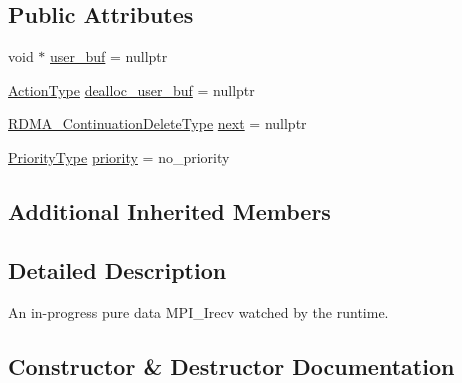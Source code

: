 \subsection*{Public Attributes}
\begin{DoxyCompactItemize}
\item 
void $\ast$ \hyperlink{structvt_1_1messaging_1_1_in_progress_data_i_recv_abe6d7de2eeb0aaa8bd453a7cb24969a8}{user\+\_\+buf} = nullptr
\item 
\hyperlink{namespacevt_ae0a5a7b18cc99d7b732cb4d44f46b0f3}{Action\+Type} \hyperlink{structvt_1_1messaging_1_1_in_progress_data_i_recv_ad1cd80fe79577e1a22177ad1f49f8c0d}{dealloc\+\_\+user\+\_\+buf} = nullptr
\item 
\hyperlink{namespacevt_a4dfad0b5809d9812d60a0311a45ae0c2}{R\+D\+M\+A\+\_\+\+Continuation\+Delete\+Type} \hyperlink{structvt_1_1messaging_1_1_in_progress_data_i_recv_a5ad86cdc45485f33d787fdc691735fbe}{next} = nullptr
\item 
\hyperlink{namespacevt_a86bff9f556eb761b27fc8600d006ac04}{Priority\+Type} \hyperlink{structvt_1_1messaging_1_1_in_progress_data_i_recv_a4ba8a7812367449cfe568d87806fd4c4}{priority} = no\+\_\+priority
\end{DoxyCompactItemize}
\subsection*{Additional Inherited Members}


\subsection{Detailed Description}
An in-\/progress pure data M\+P\+I\+\_\+\+Irecv watched by the runtime. 

\subsection{Constructor \& Destructor Documentation}
\mbox{\label{structvt_1_1messaging_1_1_in_progress_data_i_recv_a3438000780af9166527368c65284d0ee}} 
